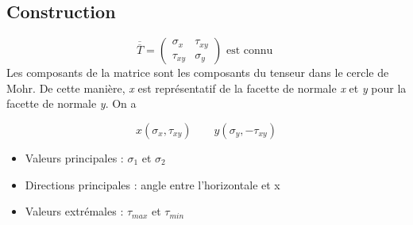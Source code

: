 \subsection*{Construction}
\begin{equation}
\overline{\overline{T}} = 
	\left(	
	\begin{array}{cc}
	\sigma _x & \tau _{xy} \\ 
	\tau _{xy} & \sigma _y
	\end{array}
	\right) \mbox{ est connu }
\end{equation}
Les composants de la matrice sont les composants du tenseur dans le cercle de Mohr. De cette manière, \textit{x} est représentatif de la facette de normale \textit{x} et \textit{y} pour la facette de normale \textit{y}. On a

\begin{equation}
x(\sigma _x , \tau _{xy}) \qquad y(\sigma _y, - \tau _{xy})
\end{equation}

\begin{itemize}
	\item Valeurs principales : $\sigma _1$ et $\sigma _2$
	\item Directions principales : angle entre l'horizontale et x
	\item Valeurs extrémales : $\tau _{max}$ et $\tau _{min}$
\end{itemize}